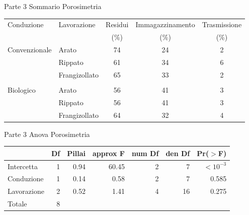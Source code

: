 \documentclass[10pt]{beamer}
\begin{document}
\begin{frame}{Parte 3 \small{Sommario Porosimetria}}

  \footnotesize
  \begin{table}[hb]
    \centering
    \begin{tabular}{llccc}%
      \hline
      Conduzione & Lavorazione & Residui & Immagazzinamento &
                                                              Trasmissione \\ 
                 &             & (\%) &  (\%) &  (\%) \\ 
      \hline
      Convenzionale & Arato & 74 & 24 & 2 \\ 
                 & Rippato & 61 & 34 & 6 \\ 
                 & Frangizollato & 65 & 33 & 2 \\ 
                 &  &  &  &  \\ 
      Biologico & Arato & 56 & 41 & 3 \\ 
                 & Rippato & 56 & 41 & 3 \\ 
                 & Frangizollato & 64 & 32 & 4 \\ 
      \hline
    \end{tabular}
  \end{table}
\end{frame}

\begin{frame}{Parte 3 \small{Anova Porosimetria}}
  \begin{table}[ht]
    \centering
    \begin{tabular}{lrrrrrr}
      \hline
      & Df & Pillai & approx F & num Df & den Df & Pr($>$F) \\ 
      \hline
      Intercetta & 1 & 0.94 & 60.45 & 2 & 7 & $<10^{-3}$ \\ 
      Conduzione & 1 & 0.14 & 0.58 & 2 & 7 & 0.585 \\ 
      Lavorazione & 2 & 0.52 & 1.41 & 4 & 16 & 0.275 \\ 
      Totale & 8 &  &  &  &  &  \\ 
      \hline
    \end{tabular}
  \end{table}
\end{frame}
\end{document}
